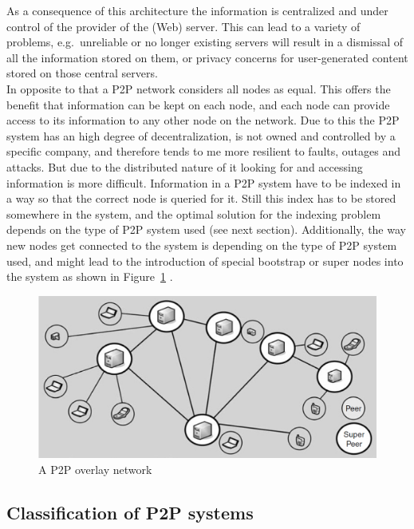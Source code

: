 As a consequence of this architecture the information is centralized and under control of the provider of the (Web) server. This can lead to a variety of problems, e.g.\ unreliable or no longer existing servers will result in a dismissal of all the information stored on them, or privacy concerns for user-generated content stored on those central servers. \\

In opposite to that a \gls{P2P} network considers all nodes as equal. This offers the benefit that information can be kept on each node, and each node can provide access to its information to any other node on the network. Due to this the \gls{P2P} system has an high degree of decentralization, is not owned and controlled by a specific company, and therefore tends to me more resilient to faults, outages and attacks. But due to the distributed nature of it looking for and accessing information is more difficult. Information in a \gls{P2P} system have to be indexed in a way so that the correct node is queried for it. Still this index has to be stored somewhere in the system, and the optimal solution for the indexing problem depends on the type of \gls{P2P} system used (see next section). Additionally, the way new nodes get connected to the system is depending on the type of \gls{P2P} system used, and might lead to the introduction of special bootstrap or super nodes into the system as shown in Figure~\ref{fig:p2p_overlay_network} \citep{parameswaran2001p2p}.

\begin{figure}[H]
	\centering
		\includegraphics[width=0.9\columnwidth]{images/p2p_network.png}
	\caption[A \gls{P2P} overlay network]{A \gls{P2P} overlay network \citep[pg. 9]{buford2009p2p}}
\label{fig:p2p_overlay_network}
\end{figure}


\subsection{Classification of \gls{P2P} systems}
\label{sec:p2p_classification}

